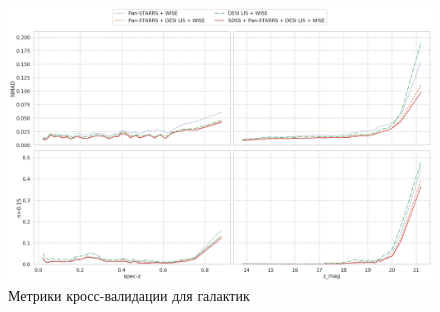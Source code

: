 \documentclass[fleqn,usenatbib]{mnras}
\begin{document}


\begin{figure}
    \centering
    \includegraphics[width=0.9\linewidth]{images/metrics-cv2-gal.png}
    \caption{Метрики кросс-валидации для галактик}
    \label{fig:metrics-cv2-gal}
\end{figure}
\end{document}
